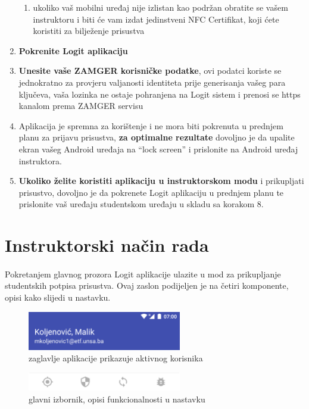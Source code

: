 \begin{enumerate}
    \begin{enumerate}
        \item ukoliko vaš mobilni uređaj nije izlistan kao podržan obratite se vašem instruktoru i biti će vam izdat jedinstveni NFC Certifikat, koji ćete koristiti za bilježenje prisustva
    \end{enumerate}
    \item \textbf{Pokrenite Logit aplikaciju}
    \item \textbf{Unesite vaše ZAMGER korisničke podatke}, ovi podatci koriste se jednokratno za provjeru valjanosti identiteta prije generisanja vašeg para ključeva, vaša lozinka ne ostaje pohranjena na Logit sistem i prenosi se https kanalom prema ZAMGER servisu
    \item Aplikacija je spremna za korištenje i ne mora biti pokrenuta u prednjem planu za prijavu prisustva, \textbf{za optimalne rezultate} dovoljno je da upalite ekran vašeg Android uređaja na “lock screen” i prislonite na Android uređaj instruktora.
    \item \textbf{Ukoliko želite koristiti aplikaciju u instruktorskom modu} i prikupljati prisustvo, dovoljno je da pokrenete Logit aplikaciju u prednjem planu te prislonite vaš uređaju studentskom uređaju u skladu sa korakom 8.
\end{enumerate}

\pagebreak[4]
\section{Instruktorski način rada}
\paragraph*{}
Pokretanjem glavnog prozora Logit aplikacije ulazite u mod za prikupljanje studentskih potpisa prisustva. Ovaj zaslon podijeljen je na četiri komponente, opisi kako slijedi u nastavku.

\begin{figure}[H]
    \centering
    \includegraphics[width=0.6\textwidth]{material/manual/01-head}
    \caption{zaglavlje aplikacije prikazuje aktivnog korisnika}
\end{figure}

\begin{figure}[H]
    \centering
    \includegraphics[width=0.6\textwidth]{material/manual/02-menu}
    \caption{glavni izbornik, opisi funkcionalnosti u nastavku}
\end{figure}

